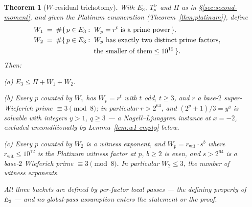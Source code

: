 \documentclass[11pt]{amsart}
\theoremstyle{plain}
\newtheorem{theorem}{Theorem}[section]
\theoremstyle{definition}
\theoremstyle{remark}
\numberwithin{equation}{section}
\begin{document}
\begin{theorem}[$W$-residual trichotomy]\label{thm:w-trichotomy}
With $E_3$, $T_p^{>}$ and $\Pi$ as in \S\ref{sec:second-moment}, and given the Platinum enumeration (Theorem~\ref{thm:platinum}), define
\[
  \begin{aligned}
  W_1 \;&=\; \#\{\,p \in E_3 :\; W_p = r^t \text{ is a prime power}\,\},\\
  W_2 \;&=\; \#\{\,p \in E_3 :\; W_p \text{ has exactly two distinct prime factors,}\\
  &\hphantom{{}=\;\#\{\,p \in E_3 :\;{}}\text{the smaller of them} \leq 10^{12}\,\}.
  \end{aligned}
\]
Then:

(a) $E_3 \leq \Pi + W_1 + W_2$.

(b) Every $p$ counted by $W_1$ has $W_p = r^t$ with $t$ odd, $t \geq 3$, and $r$ a base-$2$ \emph{super}-Wieferich prime $\equiv 3 \pmod 8$; in particular $r > 2^{64}$, and $(2^p + 1)/3 = y^q$ is solvable with integers $y > 1$, $q \geq 3$ --- a Nagell--Ljunggren instance at $x = -2$, excluded unconditionally by Lemma~\ref{lem:w1-empty} below.

(c) Every $p$ counted by $W_2$ is a witness exponent, and $W_p = r_{\mathrm{wit}} \cdot s^b$ where $r_{\mathrm{wit}} \leq 10^{12}$ is the Platinum witness factor at $p$, $b \geq 2$ is even, and $s > 2^{64}$ is a base-$2$ Wieferich prime $\equiv 3 \pmod 8$. In particular $W_2 \leq 3$, the number of witness exponents.

All three buckets are defined by per-factor \emph{local} passes --- the defining property of $E_3$ --- and no global-pass assumption enters the statement or the proof.
\end{theorem}
\end{document}
